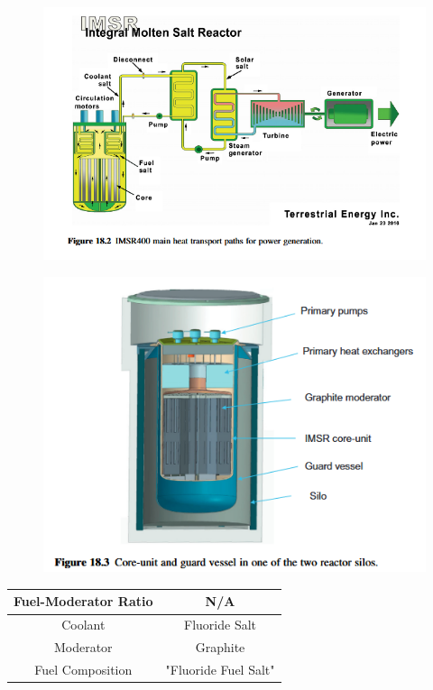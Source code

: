 \documentclass[letterpaper]{article}
\begin{document}
\begin{figure}[H]
  \centering
  \includegraphics[width=1.0\linewidth]{figures/IMSRsource1.png}
  \label{fig:fig8}
\end{figure}

\begin{figure}[H]
  \centering
  \includegraphics[width=1.0\linewidth]{figures/IMSRsource2.png}
  \label{fig:fig9}
\end{figure}

\begin{center}
\begin{tabular}{|c|c|}
\hline
Fuel-Moderator Ratio & N/A \\
\hline
Coolant & Fluoride Salt \\
\hline
Moderator & Graphite \\
\hline
Fuel Composition & "Fluoride Fuel Salt" \\
\hline
\end{tabular}
\end{center}
\end{document}
